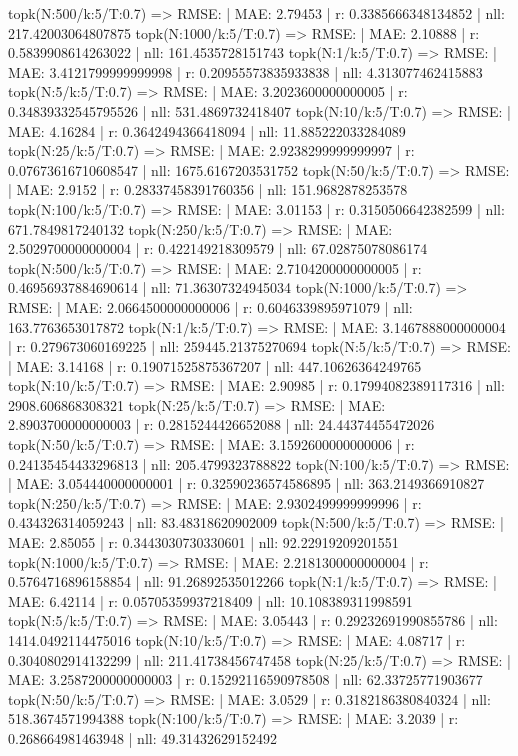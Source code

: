 topk(N:500/k:5/T:0.7) => RMSE: | MAE: 2.79453 | r: 0.3385666348134852 | nll: 217.42003064807875
topk(N:1000/k:5/T:0.7) => RMSE: | MAE: 2.10888 | r: 0.5839908614263022 | nll: 161.4535728151743
topk(N:1/k:5/T:0.7) => RMSE: | MAE: 3.4121799999999998 | r: 0.20955573835933838 | nll: 4.313077462415883
topk(N:5/k:5/T:0.7) => RMSE: | MAE: 3.2023600000000005 | r: 0.34839332545795526 | nll: 531.4869732418407
topk(N:10/k:5/T:0.7) => RMSE: | MAE: 4.16284 | r: 0.3642494366418094 | nll: 11.885222033284089
topk(N:25/k:5/T:0.7) => RMSE: | MAE: 2.9238299999999997 | r: 0.07673616710608547 | nll: 1675.6167203531752
topk(N:50/k:5/T:0.7) => RMSE: | MAE: 2.9152 | r: 0.28337458391760356 | nll: 151.9682878253578
topk(N:100/k:5/T:0.7) => RMSE: | MAE: 3.01153 | r: 0.3150506642382599 | nll: 671.7849817240132
topk(N:250/k:5/T:0.7) => RMSE: | MAE: 2.5029700000000004 | r: 0.422149218309579 | nll: 67.02875078086174
topk(N:500/k:5/T:0.7) => RMSE: | MAE: 2.7104200000000005 | r: 0.46956937884690614 | nll: 71.36307324945034
topk(N:1000/k:5/T:0.7) => RMSE: | MAE: 2.0664500000000006 | r: 0.6046339895971079 | nll: 163.7763653017872
topk(N:1/k:5/T:0.7) => RMSE: | MAE: 3.1467888000000004 | r: 0.279673060169225 | nll: 259445.21375270694
topk(N:5/k:5/T:0.7) => RMSE: | MAE: 3.14168 | r: 0.19071525875367207 | nll: 447.10626364249765
topk(N:10/k:5/T:0.7) => RMSE: | MAE: 2.90985 | r: 0.17994082389117316 | nll: 2908.606868308321
topk(N:25/k:5/T:0.7) => RMSE: | MAE: 2.8903700000000003 | r: 0.2815244426652088 | nll: 24.44374455472026
topk(N:50/k:5/T:0.7) => RMSE: | MAE: 3.1592600000000006 | r: 0.24135454433296813 | nll: 205.4799323788822
topk(N:100/k:5/T:0.7) => RMSE: | MAE: 3.054440000000001 | r: 0.32590236574586895 | nll: 363.2149366910827
topk(N:250/k:5/T:0.7) => RMSE: | MAE: 2.9302499999999996 | r: 0.434326314059243 | nll: 83.48318620902009
topk(N:500/k:5/T:0.7) => RMSE: | MAE: 2.85055 | r: 0.3443030730330601 | nll: 92.22919209201551
topk(N:1000/k:5/T:0.7) => RMSE: | MAE: 2.2181300000000004 | r: 0.5764716896158854 | nll: 91.26892535012266
topk(N:1/k:5/T:0.7) => RMSE: | MAE: 6.42114 | r: 0.05705359937218409 | nll: 10.108389311998591
topk(N:5/k:5/T:0.7) => RMSE: | MAE: 3.05443 | r: 0.29232691990855786 | nll: 1414.0492114475016
topk(N:10/k:5/T:0.7) => RMSE: | MAE: 4.08717 | r: 0.3040802914132299 | nll: 211.41738456747458
topk(N:25/k:5/T:0.7) => RMSE: | MAE: 3.2587200000000003 | r: 0.15292116590978508 | nll: 62.33725771903677
topk(N:50/k:5/T:0.7) => RMSE: | MAE: 3.0529 | r: 0.3182186380840324 | nll: 518.3674571994388
topk(N:100/k:5/T:0.7) => RMSE: | MAE: 3.2039 | r: 0.268664981463948 | nll: 49.31432629152492
